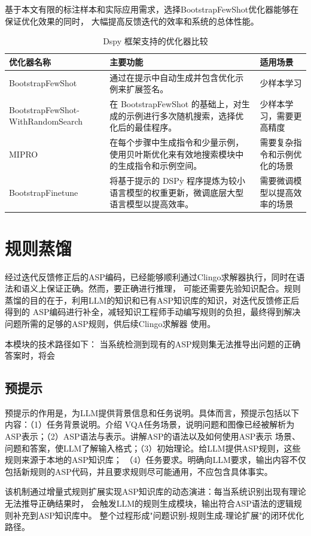 基于本文有限的标注样本和实际应用需求，选择BootstrapFewShot优化器能够在保证优化效果的同时，
大幅提高反馈迭代的效率和系统的总体性能。
\begin{table}[htbp]
\centering
\caption{Dspy 框架支持的优化器比较}
\label{tab:optimizer_comparison}
\begin{tabular}{|>{\raggedright}p{4cm}|>{\raggedright}p{8cm}|>{\raggedright\arraybackslash}p{4cm}|}
\hline
\textbf{优化器名称} & \textbf{主要功能} & \textbf{适用场景} \\
\hline
BootstrapFewShot & 通过在提示中自动生成并包含优化示例来扩展签名。 & 少样本学习 \\
\hline
BootstrapFewShot-
WithRandomSearch & 在 BootstrapFewShot 的基础上，对生成的示例进行多次随机搜索，选择优化后的最佳程序。 & 少样本学习，需要更高精度 \\
\hline
MIPRO & 在每个步骤中生成指令和少量示例，使用贝叶斯优化来有效地搜索模块中的生成指令和示例空间。 & 需要复杂指令和示例优化的场景 \\
\hline
BootstrapFinetune & 将基于提示的 DSPy 程序提炼为较小语言模型的权重更新，微调底层大型语言模型以提高效率。 & 需要微调模型以提高效率的场景 \\
\hline
\end{tabular}
\end{table}
\section{规则蒸馏}
经过迭代反馈修正后的ASP编码，已经能够顺利通过Clingo求解器执行，同时在语法和语义上保证正确。然而，要正确进行推理，
可能还需要先验知识配合。规则蒸馏的目的在于，利用LLM的知识和已有ASP知识库的知识，对迭代反馈修正后得到的
ASP编码进行补全，减轻知识工程师手动编写规则的负担，最终得到解决问题所需的足够的ASP规则，供后续Clingo求解器
使用。

本模块的技术路径如下：
当系统检测到现有的ASP规则集无法推导出问题的正确答案时，将会
\subsection{预提示}
预提示的作用是，为LLM提供背景信息和任务说明。具体而言，预提示包括以下内容：（1）任务背景说明。介绍
VQA任务场景，说明问题和图像已经被解析为ASP表示；（2）ASP语法与表示。讲解ASP的语法以及如何使用ASP表示
场景、问题和答案，使LLM了解输入格式；（3）初始理论。给LLM提供ASP规则，这些规则来源于本地的ASP知识库；
（4）任务要求。明确向LLM要求，输出内容不仅包括新规则的ASP代码，并且要求规则尽可能通用，不应包含具体事实。

该机制通过增量式规则扩展实现ASP知识库的动态演进：每当系统识别出现有理论无法推导正确结果时，
会触发LLM的规则生成模块，输出符合ASP语法的逻辑规则补充到ASP知识库中。
整个过程形成"问题识别-规则生成-理论扩展"的闭环优化路径。

